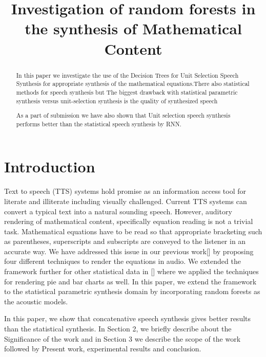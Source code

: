 \documentclass{article}
\title{Investigation of random forests in the synthesis of Mathematical Content}
\begin{document}
\maketitle

\begin{abstract}

In this paper we investigate the use of  the Decision Trees for Unit Selection Speech Synthesis for appropriate synthesis of the mathematical equations.There also statistical methods for speech synthesis but The biggest drawback with statistical parametric synthesis versus unit-selection synthesis is the quality of synthesized speech

As a part of submission we have also shown that Unit selection speech synthesis performs better than the statistical speech synthesis by RNN.

\end{abstract}

\section{Introduction}
\label{sec:intro}

Text to speech (TTS) systems hold promise as an information access tool for literate and illiterate including visually challenged. Current TTS systems can convert a typical text into a natural sounding speech. However, auditory rendering of mathematical content, specifically equation reading is not a trivial task. Mathematical equations have to be read so that appropriate bracketing such as parentheses, superscripts and subscripts are conveyed to the listener in an accurate way. We have addressed this issue in our previous work[] by proposing four different techniques to render the equations in audio. We extended the framework further for other statistical data in [] where we applied the techniques for rendering pie and bar charts as well. In this paper, we extend the framework to the statistical parametric synthesis domain by incorporating random forests as the acoustic models. 
 

 

In this paper, we show that concatenative speech synthesis gives better results than the statistical synthesis. In Section 2, we briefly describe about the Significance of the work and in Section 3 we describe the scope of the work followed by  Present work, experimental results and conclusion.
\end{document}

